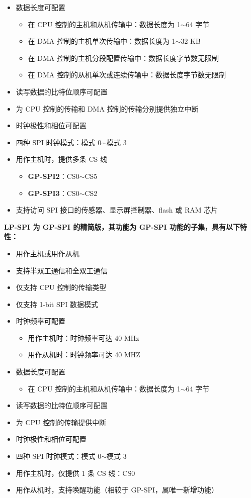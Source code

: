 \documentclass[main\_\_CN.tex]{subfiles}
\begin{document}
\begin{itemize}
    \item 数据长度可配置
    \begin{itemize}
        \item 在 CPU 控制的主机和从机传输中：数据长度为 1$\sim$64 字节
        \item 在 DMA 控制的主机单次传输中：数据长度为 1$\sim$32 KB 
        \item 在 DMA 控制的主机分段配置传输中：数据长度字节数无限制 
        \item 在 DMA 控制的从机单次或连续传输中：数据长度字节数无限制
    \end{itemize}
    \item 读写数据的比特位顺序可配置
    \item 为 CPU 控制的传输和 DMA 控制的传输分别提供独立中断 
    \item 时钟极性和相位可配置
    \item 四种 SPI 时钟模式：模式 0$\sim$模式 3
    \item 用作主机时，提供多条 CS 线 
    \begin{itemize}
        \item \textbf{GP-SPI2}：CS0$\sim$CS5
        \item \textbf{GP-SPI3}：CS0$\sim$CS2
    \end{itemize}
    \item 支持访问 SPI 接口的传感器、显示屏控制器、flash 或 RAM 芯片
\end{itemize}

\textbf{LP-SPI 为 GP-SPI 的精简版，其功能为 GP-SPI 功能的子集，具有以下特性：}
\begin{itemize}
    \item 用作主机或用作从机
    \item 支持半双工通信和全双工通信
    \item 仅支持 CPU 控制的传输类型
    \item 仅支持 1-bit SPI 数据模式
    \item 时钟频率可配置
        \begin{itemize}
            \item 用作主机时：时钟频率可达 40 MHz
            \item 用作从机时：时钟频率可达 40 MHZ
        \end{itemize}
    \item 数据长度可配置
    \begin{itemize}
        \item 在 CPU 控制的主机和从机传输中：数据长度为 1$\sim$64 字节
    \end{itemize}
    \item 读写数据的比特位顺序可配置
    \item 为 CPU 控制的传输提供中断 
    \item 时钟极性和相位可配置
    \item 四种 SPI 时钟模式：模式 0$\sim$模式 3
    \item 用作主机时，仅提供 1 条 CS 线：CS0 
    \item 用作从机时，支持唤醒功能（相较于 GP-SPI，属唯一新增功能）
\end{itemize}
\end{document}

